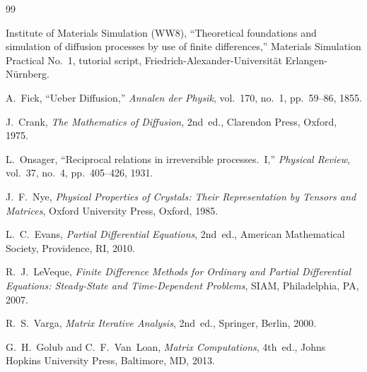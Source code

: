 \documentclass[11pt,a4paper]{article}
\numberwithin{equation}{section}
\theoremstyle{definition}
\theoremstyle{remark}
\begin{document}
\begin{thebibliography}{99}

Institute of Materials Simulation (WW8),
``Theoretical foundations and simulation of diffusion processes by use of finite
differences,''
Materials Simulation Practical No.~1, tutorial script,
Friedrich-Alexander-Universit\"at Erlangen-N\"urnberg.

A.~Fick,
``Ueber Diffusion,''
\textit{Annalen der Physik},
vol.~170, no.~1, pp.~59--86, 1855.

J.~Crank,
\textit{The Mathematics of Diffusion},
2nd~ed.,
Clarendon Press, Oxford, 1975.

L.~Onsager,
``Reciprocal relations in irreversible processes.~I,''
\textit{Physical Review},
vol.~37, no.~4, pp.~405--426, 1931.

J.~F.~Nye,
\textit{Physical Properties of Crystals: Their Representation by Tensors and Matrices},
Oxford University Press, Oxford, 1985.

L.~C.~Evans,
\textit{Partial Differential Equations},
2nd~ed.,
American Mathematical Society, Providence, RI, 2010.

R.~J.~LeVeque,
\textit{Finite Difference Methods for Ordinary and Partial Differential Equations:
Steady-State and Time-Dependent Problems},
SIAM, Philadelphia, PA, 2007.

R.~S.~Varga,
\textit{Matrix Iterative Analysis},
2nd~ed.,
Springer, Berlin, 2000.

G.~H.~Golub and C.~F.~Van~Loan,
\textit{Matrix Computations},
4th~ed.,
Johns Hopkins University Press, Baltimore, MD, 2013.

\end{thebibliography}
\end{document}
